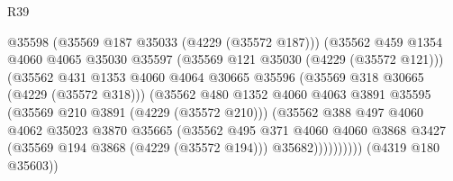 \begin{lexlean}{R39}
\begin{coremodule}
                                            @35598
                                            (@35569 @187 @35033 (@4229 (@35572 @187)))
                                            (@35562
                                              @459
                                              @1354
                                              @4060
                                              @4065
                                              @35030
                                              @35597
                                              (@35569 @121 @35030 (@4229 (@35572 @121)))
                                              (@35562
                                                @431
                                                @1353
                                                @4060
                                                @4064
                                                @30665
                                                @35596
                                                (@35569 @318 @30665 (@4229 (@35572 @318)))
                                                (@35562
                                                  @480
                                                  @1352
                                                  @4060
                                                  @4063
                                                  @3891
                                                  @35595
                                                  (@35569 @210 @3891 (@4229 (@35572 @210)))
                                                  (@35562
                                                    @388
                                                    @497
                                                    @4060
                                                    @4062
                                                    @35023
                                                    @3870
                                                    @35665
                                                    (@35562
                                                      @495
                                                      @371
                                                      @4060
                                                      @4060
                                                      @3868
                                                      @3427
                                                      (@35569 @194 @3868 (@4229 (@35572 @194)))
                                                      @35682))))))))))
                                  (@4319 @180 @35603))

\end{coremodule}
\end{lexlean}
